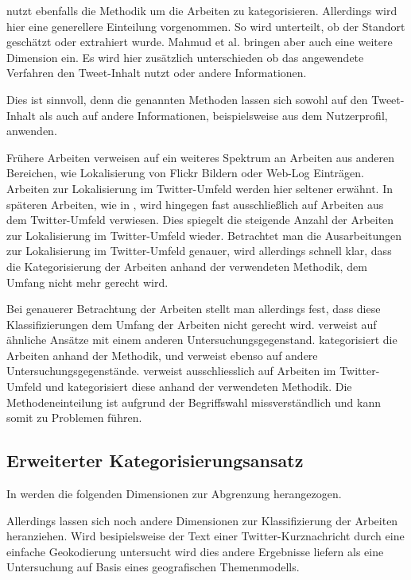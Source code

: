 		\cite{Mahmud2012} nutzt ebenfalls die Methodik um die Arbeiten zu kategorisieren. 
		Allerdings wird hier eine generellere Einteilung vorgenommen. 
		So wird unterteilt, ob der Standort geschätzt oder extrahiert wurde.  
		Mahmud et al. bringen aber auch eine weitere Dimension ein. 
		Es wird hier zusätzlich unterschieden ob das angewendete Verfahren den Tweet-Inhalt nutzt oder andere Informationen. 

		Dies ist sinnvoll, denn die genannten Methoden lassen sich sowohl auf den Tweet-Inhalt als auch auf andere Informationen, beispielsweise aus dem Nutzerprofil, anwenden. 
		
		Frühere Arbeiten verweisen auf ein weiteres Spektrum an Arbeiten aus anderen Bereichen, wie Lokalisierung von Flickr Bildern oder Web-Log Einträgen.
		Arbeiten zur Lokalisierung im Twitter-Umfeld werden hier seltener erwähnt. 
		In späteren Arbeiten, wie in \cite{Priedhorsky2013}, wird hingegen fast ausschließlich auf Arbeiten aus dem Twitter-Umfeld verwiesen. 
		Dies spiegelt die steigende Anzahl der Arbeiten zur Lokalisierung im Twitter-Umfeld wieder.
		Betrachtet man die Ausarbeitungen zur Lokalisierung im Twitter-Umfeld genauer, wird allerdings schnell klar, dass die Kategorisierung der Arbeiten anhand der verwendeten Methodik, dem Umfang nicht mehr gerecht wird. 
		
		Bei genauerer Betrachtung der Arbeiten stellt man allerdings fest, dass diese Klassifizierungen dem Umfang der Arbeiten nicht gerecht wird. 
		\cite{Hecht2011} verweist auf ähnliche Ansätze mit einem anderen Untersuchungsgegenstand.
		\cite{Cheng2010} kategorisiert die Arbeiten anhand der Methodik, und verweist ebenso auf andere Untersuchungsgegenstände. 
		\cite{Priedhorsky2013} verweist ausschliesslich auf Arbeiten im Twitter-Umfeld und kategorisiert diese anhand der verwendeten Methodik. 
		Die Methodeneinteilung ist aufgrund der Begriffswahl missverständlich und kann somit zu Problemen führen. 

		\subsection{Erweiterter Kategorisierungsansatz}
		In \cite{Schulz2013} werden die folgenden Dimensionen zur Abgrenzung herangezogen.


		Allerdings lassen sich noch andere Dimensionen zur Klassifizierung der Arbeiten heranziehen. 
		Wird besipielsweise der Text einer Twitter-Kurznachricht durch eine einfache Geokodierung untersucht wird dies andere Ergebnisse liefern als eine Untersuchung auf Basis eines geografischen Themenmodells.  
		

